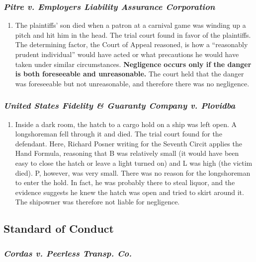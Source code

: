 \subsubsection{\emph{Pitre v. Employers Liability Assurance Corporation}}

\begin{enumerate}
    \item The plaintiffs' son died when a patron at a carnival game was 
    winding up a pitch and hit him in the head. The trial court found in favor 
    of the plaintiffs. The determining factor, the Court of Appeal reasoned, 
    is how a ``reasonably prudent individual'' would have acted or what 
    precautions he would have taken under similar circumstances. 
    \textbf{Negligence occurs only if the danger is both foreseeable and 
    unreasonable.} The court held that the danger was foreseeable but not 
    unreasonable, and therefore there was no negligence.
\end{enumerate}

\subsubsection{\emph{United States Fidelity \& Guaranty Company v. Plovidba}}

\begin{enumerate}
    \item Inside a dark room, the hatch to a cargo hold on a ship was left 
    open. A longshoreman fell through it and died. The trial court found for 
    the defendant. Here, Richard Posner writing for the Seventh Circit applies 
    the Hand Formula, reasoning that B was relatively small (it would have 
    been easy to close the hatch or leave a light turned on) and L was high 
    (the victim died). P, however, was very small. There was no reason for the 
    longshoreman to enter the hold. In fact, he was probably there to steal 
    liquor, and the evidence suggests he knew the hatch was open and tried to 
    skirt around it. The shipowner was therefore not liable for negligence.
\end{enumerate}

\subsection{Standard of Conduct}

\subsubsection{\emph{Cordas v. Peerless Transp. Co.}}

